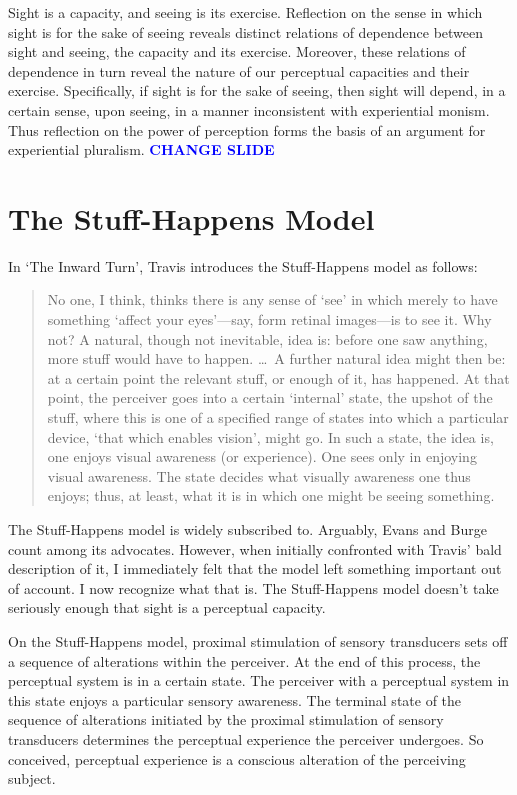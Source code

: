 \documentclass[12pt]{article}
\newcommand{\change}{\textcolor{blue}{\textbf{CHANGE SLIDE}}}
\begin{document}
Sight is a capacity, and seeing is its exercise. Reflection on the sense in which sight is for the sake of seeing reveals distinct relations of dependence between sight and seeing, the capacity and its exercise. Moreover, these relations of dependence in turn reveal the nature of our perceptual capacities and their exercise. Specifically, if sight is for the sake of seeing, then sight will depend, in a certain sense, upon seeing, in a manner inconsistent with experiential monism. Thus reflection on the power of perception forms the basis of an argument for experiential pluralism. \change


\section{The Stuff-Happens Model} %
\label{sec:the_stuff_happens_model}

In `The Inward Turn', Travis introduces the Stuff-Happens model as follows:
\begin{quote}
    No one, I think, thinks there is any sense of ‘see’ in which merely to have something `affect your eyes'---say, form retinal images---is to see it. Why not? A natural, though not inevitable, idea is: before one saw anything, more stuff would have to happen. \ldots\ A further natural idea might then be: at a certain point the relevant stuff, or enough of it, has happened. At that point, the perceiver goes into a certain `internal' state, the upshot of the stuff, where this is one of a specified range of states into which a particular device, `that which enables vision', might go. In such a state, the idea is, one enjoys visual awareness (or experience). One sees only in enjoying visual awareness. The state decides what visually awareness one thus enjoys; thus, at least, what it is in which one might be seeing something.
\end{quote}
The Stuff-Happens model is widely subscribed to. Arguably, Evans and Burge count among its advocates. However, when initially confronted with Travis' bald description of it, I immediately felt that the model left something important out of account. I now recognize what that is. The Stuff-Happens model doesn't take seriously enough that sight is a perceptual capacity.

On the Stuff-Happens model, proximal stimulation of sensory transducers sets off a sequence of alterations within the perceiver. At the end of this process, the perceptual system is in a certain state. The perceiver with a perceptual system in this state enjoys a particular sensory awareness. The terminal state of the sequence of alterations initiated by the proximal stimulation of sensory transducers determines the perceptual experience the perceiver undergoes. So conceived, perceptual experience is a conscious alteration of the perceiving subject.
\end{document}
